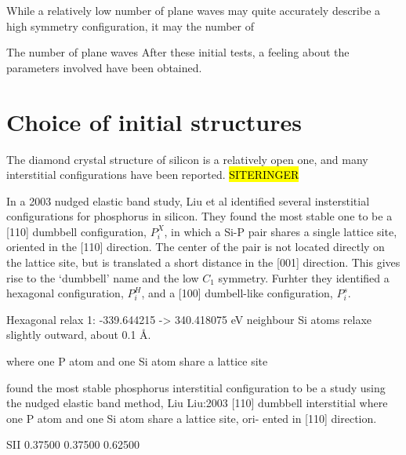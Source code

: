 \documentclass[11pt,bibliography=totoc,index=totoc]{scrbook}   %
\newcommand{\comment}[1]{\hl{#1}}
\begin{document}
While a relatively low number of plane waves 
may quite accurately describe a high symmetry configuration, it may 
the number of 

The number of plane waves 
After these initial tests, a feeling about the parameters involved have been obtained. 





\section{Choice of initial structures}\label{seq:initial-structures}

The diamond crystal structure of silicon is a relatively open one, and many interstitial configurations have been reported.
\comment{SITERINGER}

In a 2003 nudged elastic band study, Liu et al identified several insterstitial configurations for phosphorus in silicon.
They found the most stable one to be a [110] dumbbell configuration, $P_i^X$, in which a Si-P pair shares a single lattice site, oriented in the [110] direction. The center of the pair is not located directly on the lattice site, but is translated a short distance in the [001] direction. This gives rise to the `dumbbell' name and the low $C_1$ symmetry.
Furhter they identified a hexagonal configuration, $P_i^H$, and a [100] dumbell-like configuration, $P_i^s$.



Hexagonal relax 1: -339.644215 -> 340.418075 eV
neighbour Si atoms relaxe slightly outward, about 0.1 Å.

where one P atom and one Si atom share a lattice site

found the most stable phosphorus interstitial configuration to be a
 study using the nudged elastic band method, Liu 
Liu:2003
[110] dumbbell interstitial where one P atom and one Si atom share a lattice site, ori- ented in [110] direction.


SII	 0.37500	 0.37500	 0.62500
\end{document}
